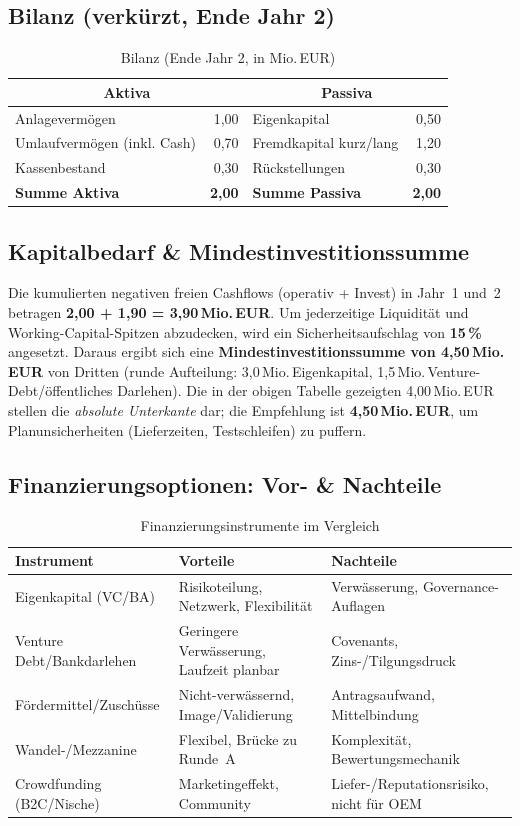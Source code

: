 \documentclass[
%
ngerman %
%
numeric %
]{wbh-assignment}
\begin{document}
\subsection{Bilanz (verkürzt, Ende Jahr 2)}
\begin{table}[htb!]
\centering
\caption{Bilanz (Ende Jahr 2, in Mio.\,EUR)}
\begin{tabular}{l r l r}
\multicolumn{2}{c}{\textbf{Aktiva}} & \multicolumn{2}{c}{\textbf{Passiva}} \\
\hline
Anlagevermögen & 1{,}00 & Eigenkapital & 0{,}50 \\
Umlaufvermögen (inkl. Cash) & 0{,}70 & Fremdkapital kurz/lang & 1{,}20 \\
Kassenbestand & 0{,}30 & Rückstellungen & 0{,}30 \\
\textbf{Summe Aktiva} & \textbf{2{,}00} & \textbf{Summe Passiva} & \textbf{2{,}00} \\
\end{tabular}
\end{table}

\subsection{Kapitalbedarf \& Mindestinvestitionssumme}
Die kumulierten negativen freien Cashflows (operativ + Invest) in Jahr~1 und~2 betragen \textbf{2{,}00 + 1{,}90 = 3{,}90\,Mio.\,EUR}. Um jederzeitige Liquidität und Working-Capital-Spitzen abzudecken, wird ein Sicherheitsaufschlag von \textbf{15\,\%} angesetzt. Daraus ergibt sich eine \textbf{Mindestinvestitionssumme von 4{,}50\,Mio.\,EUR} von Dritten (runde Aufteilung: 3{,}0\,Mio.\,Eigenkapital, 1{,}5\,Mio.\,Venture-Debt/öffentliches Darlehen). Die in der obigen Tabelle gezeigten 4{,}00\,Mio.\,EUR stellen die \emph{absolute Unterkante} dar; die Empfehlung ist \textbf{4{,}50\,Mio.\,EUR}, um Planunsicherheiten (Lieferzeiten, Testschleifen) zu puffern.

\subsection{Finanzierungsoptionen: Vor- \& Nachteile}
\begin{table}[htb!]
\centering
\caption{Finanzierungsinstrumente im Vergleich}
\begin{tabular}{l l l}
\textbf{Instrument} & \textbf{Vorteile} & \textbf{Nachteile} \\
\hline
Eigenkapital (VC/BA) & Risikoteilung, Netzwerk, Flexibilität & Verwässerung, Governance-Auflagen \\
Venture Debt/Bankdarlehen & Geringere Verwässerung, Laufzeit planbar & Covenants, Zins-/Tilgungsdruck \\
Fördermittel/Zuschüsse & Nicht-verwässernd, Image/Validierung & Antragsaufwand, Mittelbindung \\
Wandel-/Mezzanine & Flexibel, Brücke zu Runde~A & Komplexität, Bewertungsmechanik \\
Crowdfunding (B2C/Nische) & Marketingeffekt, Community & Liefer-/Reputationsrisiko, nicht für OEM \\
\end{tabular}
\end{table}
\end{document}
